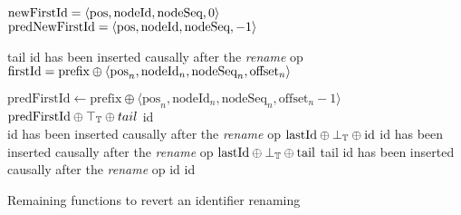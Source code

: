 \begin{algorithm}[!ht]
  \footnotesize
  \begin{algorithmic}[1]
        \Statex \Comment $\text{newFirstId} = \langle \text{pos},\text{nodeId},\text{nodeSeq},0 \rangle$
        \Statex \Comment $\text{predNewFirstId} = \langle \text{pos},\text{nodeId},\text{nodeSeq},-1 \rangle$

                  \State \Return tail \label{appendix-revert-rename-id-concurrent-1}
              \Else
                  \Statex \Comment id has been inserted causally after the \emph{rename} op
                  \Statex \Comment $\text{firstId} = \text{prefix} \oplus \langle \text{pos}_{n},\text{nodeId}_{n},\text{nodeSeq}_{n},\text{offset}_{n} \rangle$

                  \State $\text{predFirstId} \gets \text{prefix} \oplus \langle \text{pos}_n,\text{nodeId}_n,\text{nodeSeq}_n,\text{offset}_n - 1 \rangle$
                  \State \Return $\text{predFirstId} \oplus \top_\mathbb{T} \oplus tail$ \Comment \commenttopt \label{appendix-revert-rename-id-causally-after-1}
              \EndIf
          \Else
              \State \Return id \label{appendix-revert-rename-id-simple-1}
          \EndIf
      \EndFunction
      \\
              \Statex \Comment id has been inserted causally after the \emph{rename} op
              \State \Return $\text{lastId} \oplus \bot_\mathbb{T} \oplus \text{id}$ \Comment \commentbott \label{appendix-revert-rename-id-causally-after-2}
                  \Statex \Comment id has been inserted causally after the \emph{rename} op
                  \State \Return $\text{lastId} \oplus \bot_\mathbb{T} \oplus \text{tail}$ \Comment \commentbott \label{appendix-revert-rename-id-causally-after-3}
                  \State \Return tail \label{appendix-revert-rename-id-concurrent-2}
              \Else
                  \Statex \Comment id has been inserted causally after the \emph{rename} op
                  \State \Return id \label{appendix-revert-rename-id-simple-2}
              \EndIf
          \Else
              \State \Return id \label{appendix-revert-rename-id-simple-3}
          \EndIf
      \EndFunction
  \end{algorithmic}
  \caption{Remaining functions to revert an identifier renaming}
  \label{alg:appendix-revert-rename-id}
\end{algorithm}

